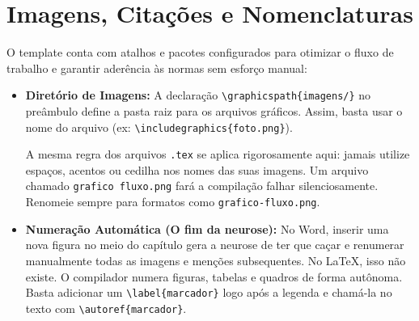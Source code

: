\documentclass[a4paper,12pt]{article}
\begin{document}
\section{Imagens, Citações e Nomenclaturas}

O template conta com atalhos e pacotes configurados para otimizar o fluxo de trabalho e garantir aderência às normas sem esforço manual:

\begin{itemize}
    \item \textbf{Diretório de Imagens:} A declaração \texttt{\textbackslash graphicspath\{imagens/\}} no preâmbulo define a pasta raiz para os arquivos gráficos. Assim, basta usar o nome do arquivo (ex: \texttt{\textbackslash includegraphics\{foto.png\}}). 
    
    \begin{atencao}
    A mesma regra dos arquivos \texttt{.tex} se aplica rigorosamente aqui: jamais utilize espaços, acentos ou cedilha nos nomes das suas imagens. Um arquivo chamado \texttt{grafico fluxo.png} fará a compilação falhar silenciosamente. Renomeie sempre para formatos como \texttt{grafico-fluxo.png}.
    \end{atencao}
    
    \item \textbf{Numeração Automática (O fim da neurose):} No Word, inserir uma nova figura no meio do capítulo gera a neurose de ter que caçar e renumerar manualmente todas as imagens e menções subsequentes. No \LaTeX, isso não existe. O compilador numera figuras, tabelas e quadros de forma autônoma. Basta adicionar um \texttt{\textbackslash label\{marcador\}} logo após a legenda e chamá-la no texto com \texttt{\textbackslash autoref\{marcador\}}.
    

\end{itemize}
\end{document}
